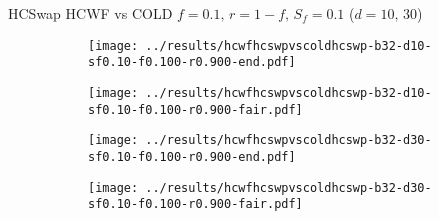 \documentclass[8pt,a4paper]{beamer}
\begin{document}
	
		
	
		\begin{frame}{HCSwap HCWF vs COLD $f=0.1,\, r=1-f,\,S_f=0.1$  ($d=10,\, 30$)}
			\begin{figure}
				\begin{subfigure}{.48\textwidth}
					\centering
					\texttt{[image: ../results/hcwfhcswpvscoldhcswp-b32-d10-sf0.10-f0.100-r0.900-end.pdf]}
				\end{subfigure}
				\begin{subfigure}{.48\textwidth}
					\centering
					\texttt{[image: ../results/hcwfhcswpvscoldhcswp-b32-d10-sf0.10-f0.100-r0.900-fair.pdf]}
				\end{subfigure}
			\end{figure}
			
			\begin{figure}
				\begin{subfigure}{.48\textwidth}
					\centering
					\texttt{[image: ../results/hcwfhcswpvscoldhcswp-b32-d30-sf0.10-f0.100-r0.900-end.pdf]}
				\end{subfigure}
				\begin{subfigure}{.48\textwidth}
					\centering
					\texttt{[image: ../results/hcwfhcswpvscoldhcswp-b32-d30-sf0.10-f0.100-r0.900-fair.pdf]}
				\end{subfigure}
			\end{figure}
		\end{frame}
	
\end{document}
